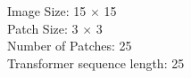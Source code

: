 \documentclass[preview]{standalone}
\begin{document}
\begin{center}
Image Size: 15 $\times$ 15 \\
            Patch Size: 3 $\times$ 3 \\
            Number of Patches: 25 \\
            Transformer sequence length: 25
\end{center}
\end{document}
